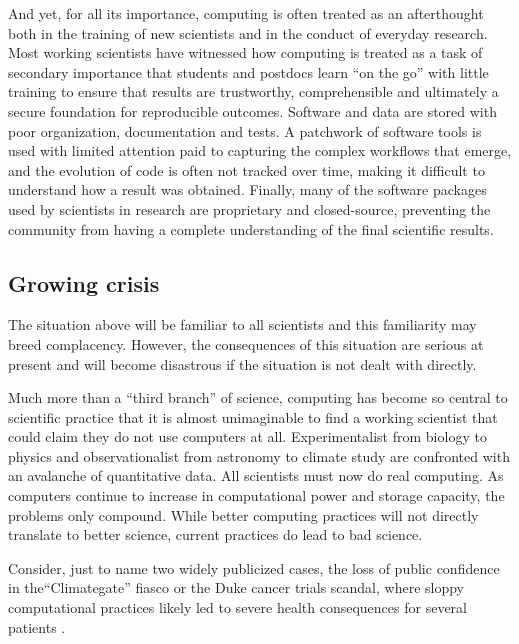 \documentclass[ChapterTOCs,krantz2]{krantz} %
\begin{document}
And yet, for all its importance, computing is often treated as an
afterthought both in the training of new scientists and in the conduct
of everyday research. Most working scientists have witnessed how computing
is treated as a task of secondary importance that students and postdocs
learn ``on the go'' with little training to ensure that results
are trustworthy, comprehensible and ultimately a secure foundation
for reproducible outcomes. Software and data are stored with poor
organization, documentation and tests. A patchwork of software tools
is used with limited attention paid to capturing the complex workflows
that emerge, and the evolution of code is often not tracked over time,
making it difficult to understand how a result was obtained. Finally,
many of the software packages used by scientists in research are proprietary
and closed-source, preventing the community from having a complete
understanding of the final scientific results.

\subsection{Growing crisis}

The situation above will be familiar to all scientists and this familiarity
may breed complacency. However, the consequences of this situation are serious
at present and will become disastrous if the situation is not dealt with
directly. 

Much more than a ``third branch'' of science, computing has become so central
to scientific practice that it is almost unimaginable to find a working
scientist that could claim they do not use computers at all.  Experimentalist
from biology to physics and observationalist from astronomy to climate study
are confronted with an avalanche of quantitative data.  All scientists must now
do real computing.  As computers continue to increase in computational power and
storage capacity, the problems only compound.  While better computing practices
will not directly translate to better science, current practices do lead to bad
science.

Consider, just to name two widely publicized cases, the loss of public
confidence in the``Climategate'' fiasco \cite{Hef10} or the Duke cancer trials
scandal, where sloppy computational practices likely led to severe health
consequences for several patients \cite{Cou10}. 
\end{document}
